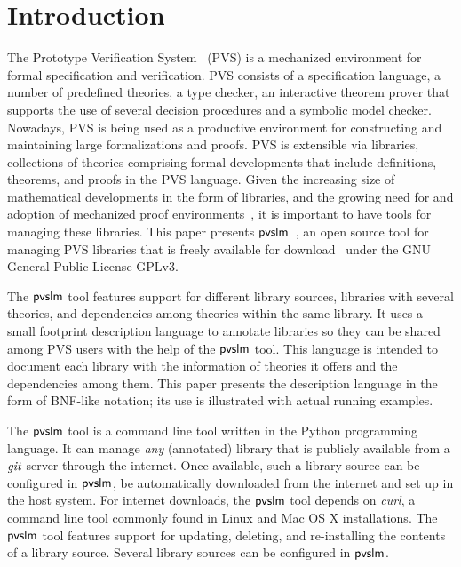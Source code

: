 \section{Introduction}
\label{sec.intro}

The Prototype Verification System~\cite{pvs-cade92} (PVS) is a
mechanized environment for formal specification and verification.  PVS
consists of a specification language, a number of predefined theories,
a type checker, an interactive theorem prover that supports the use of
several decision procedures and a symbolic model checker.  Nowadays,
PVS is being used as a productive environment for constructing and
maintaining large formalizations and proofs. PVS is extensible via
libraries, collections of theories comprising formal developments that
include definitions, theorems, and proofs in the PVS language. Given
the increasing size of mathematical developments in the form of
libraries, and the growing need for and adoption of mechanized proof
environments~\cite{avigad-mech14,hales-proofs14}, it is important to
have tools for managing these libraries. This paper presents
$\textsf{pvslm}$~\cite{pvslm}, an open source tool for managing PVS libraries
that is freely available for download~\cite{pvslm} under the GNU
General Public License GPLv3.

The $\textsf{pvslm}$ tool features support for different library sources,
libraries with several theories, and dependencies among theories
within the same library. It uses a small footprint description
language to annotate libraries so they can be shared among PVS users
with the help of the $\textsf{pvslm}$ tool. This language is intended to
document each library with the information of theories it offers and
the dependencies among them. This paper presents the description
language in the form of BNF-like notation; its use is illustrated with
actual running examples.

The $\textsf{pvslm}$ tool is a command line tool written in the Python
programming language. It can manage {\em any} (annotated) library that
is publicly available from a $\textit{git}$ server through the internet.  Once
available, such a library source can be configured in $\textsf{pvslm}$, be
automatically downloaded from the internet and set up in the host
system. For internet downloads, the $\textsf{pvslm}$ tool depends on {\em
  curl}, a command line tool commonly found in Linux and Mac OS X
installations. The $\textsf{pvslm}$ tool features support for updating,
deleting, and re-installing the contents of a library source.  Several
library sources can be configured in $\textsf{pvslm}$.

